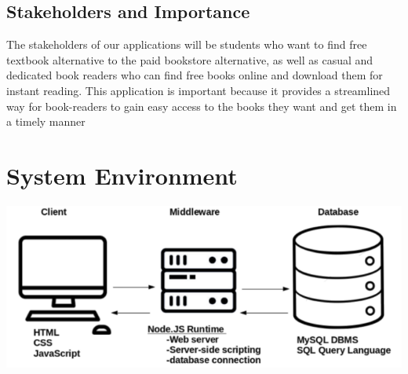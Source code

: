 \documentclass[letter, 12pt, titlepage]{article}
\begin{document}
        \subsection{Stakeholders and Importance}
        The stakeholders of our applications will be students who want to find free textbook alternative to the paid bookstore alternative, as well as casual and dedicated book readers who can find free books online and download them for instant reading. This application is important because it provides a streamlined way for book-readers to gain easy access to the books they want and get them in a timely manner


	\section{System Environment}
	
			\includegraphics[scale=.66]{3-tier.png}
\end{document}
